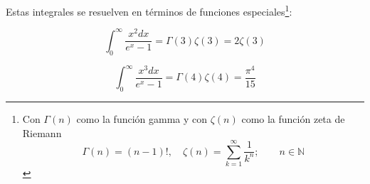 


Estas integrales se resuelven en términos de funciones especiales\footnote{Con $\Gamma(n)$ como la función gamma y con $\zeta(n)$ como la función zeta de Riemann
$$
    \Gamma(n) = (n-1)!, \quad \zeta(n) = \sum_{k=1}^{\infty} \frac{1}{k^n}; \qquad n \in \mathbb{N}
$$
}:

\begin{equation}\label{eq-sol-int-N}
    \int_0^\infty \frac{x^2 dx}{e^x-1} = \Gamma(3)\zeta(3) = 2\zeta(3)
\end{equation}

\begin{equation}\label{eq-sol-int-E}
    \int_0^\infty \frac{x^3 dx}{e^x-1} = \Gamma(4)\zeta(4) = \frac{\pi^4}{15}
\end{equation}






